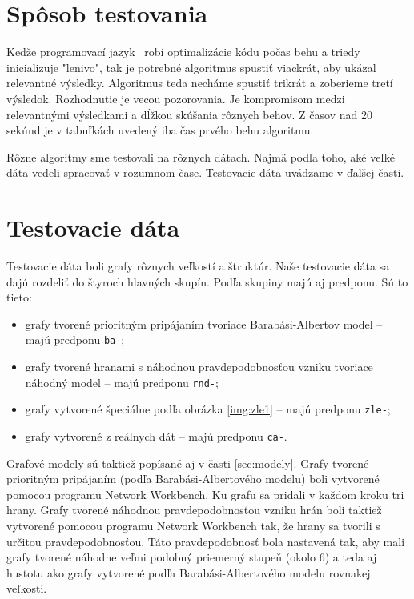 \section{Spôsob testovania}

Keďže programovací jazyk \Java\ robí optimalizácie kódu počas behu a triedy 
inicializuje "lenivo", tak je potrebné algoritmus spustiť viackrát, aby ukázal 
relevantné výsledky. Algoritmus teda necháme spustiť trikrát a zoberieme tretí 
výsledok. Rozhodnutie je vecou pozorovania. Je kompromisom medzi relevantnými 
výsledkami a dĺžkou skúšania rôznych behov. Z časov nad 20 sekúnd je v 
tabuľkách uvedený iba čas prvého behu algoritmu. 

Rôzne algoritmy sme testovali na rôznych dátach. Najmä podľa toho, aké veľké 
dáta vedeli spracovať v rozumnom čase. Testovacie dáta uvádzame v ďalšej časti.

\section{Testovacie dáta}\label{sec:data}

Testovacie dáta boli grafy rôznych veľkostí a štruktúr. Naše testovacie dáta sa 
dajú rozdeliť do štyroch hlavných skupín. Podľa skupiny majú aj predponu. Sú to 
tieto:

\begin{itemize}
	\item grafy tvorené prioritným pripájaním tvoriace Barabási-Albertov model 
		-- majú predponu \texttt{ba-};
	\item grafy tvorené hranami s náhodnou pravdepodobnosťou vzniku tvoriace 
	náhodný model -- majú predponu \texttt{rnd-};
	\item grafy vytvorené špeciálne podľa obrázka \ref{img:zle1} -- majú 
		predponu \texttt{zle-};
	\item grafy vytvorené z reálnych dát -- majú predponu \texttt{ca-}.
\end{itemize}

Grafové modely sú taktiež popísané aj v časti \ref{sec:modely}. Grafy tvorené 
prioritným pripájaním (podľa Barabási-Albertového modelu) boli 
vytvorené pomocou programu Network Workbench. Ku grafu sa pridali v každom 
kroku tri hrany.
Grafy tvorené náhodnou pravdepodobnosťou vzniku hrán boli taktiež vytvorené 
pomocou programu Network Workbench tak, že hrany sa tvorili s určitou 
pravdepodobnosťou. Táto pravdepodobnosť bola nastavená tak, aby mali grafy 
tvorené náhodne veľmi podobný priemerný stupeň (okolo 6) a teda aj hustotu ako 
grafy vytvorené podľa Barabási-Albertového modelu rovnakej veľkosti. 

